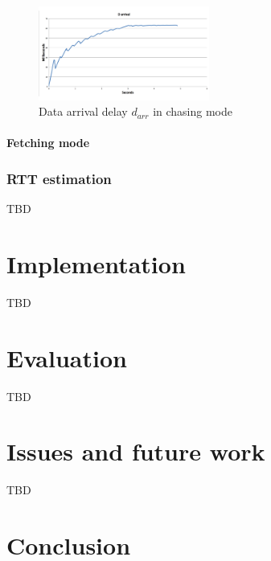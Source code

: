 \documentclass[10pt]{proc}
\begin{document}
\begin{figure}[Ht!]
\centering
\includegraphics[width=0.5\textwidth]{darr}
\caption{Data arrival delay $d_{arr}$ in chasing mode}
\label{fig:darr}
\end{figure} 

\paragraph{Fetching mode}


\subsubsection{RTT estimation}
TBD

\section{Implementation}
TBD

\section{Evaluation}
TBD

\section{Issues and future work}
TBD

\section{Conclusion}
\end{document}
